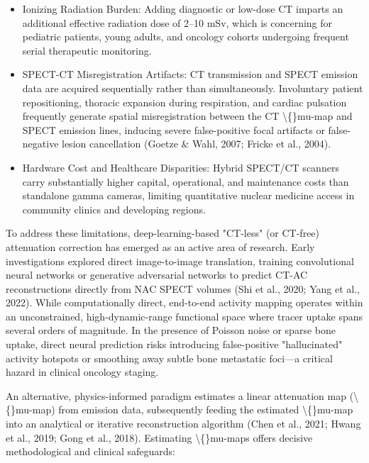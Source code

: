 \documentclass[11pt]{article}
\begin{document}
\begin{itemize}\item  Ionizing Radiation Burden: Adding diagnostic or low-dose CT imparts an additional effective radiation dose of 2–10 mSv, which is concerning for pediatric patients, young adults, and oncology cohorts undergoing frequent serial therapeutic monitoring.\end{itemize}
\begin{itemize}\item  SPECT-CT Misregistration Artifacts: CT transmission and SPECT emission data are acquired sequentially rather than simultaneously. Involuntary patient repositioning, thoracic expansion during respiration, and cardiac pulsation frequently generate spatial misregistration between the CT \textbackslash\{\}mu-map and SPECT emission lines, inducing severe false-positive focal artifacts or false-negative lesion cancellation (Goetze \& Wahl, 2007; Fricke et al., 2004).\end{itemize}
\begin{itemize}\item  Hardware Cost and Healthcare Disparities: Hybrid SPECT/CT scanners carry substantially higher capital, operational, and maintenance costs than standalone gamma cameras, limiting quantitative nuclear medicine access in community clinics and developing regions.\end{itemize}
To address these limitations, deep-learning-based "CT-less" (or CT-free) attenuation correction has emerged as an active area of research. Early investigations explored direct image-to-image translation, training convolutional neural networks or generative adversarial networks to predict CT-AC reconstructions directly from NAC SPECT volumes (Shi et al., 2020; Yang et al., 2022). While computationally direct, end-to-end activity mapping operates within an unconstrained, high-dynamic-range functional space where tracer uptake spans several orders of magnitude. In the presence of Poisson noise or sparse bone uptake, direct neural prediction risks introducing false-positive "hallucinated" activity hotspots or smoothing away subtle bone metastatic foci—a critical hazard in clinical oncology staging.\par

An alternative, physics-informed paradigm estimates a linear attenuation map (\textbackslash\{\}mu-map) from emission data, subsequently feeding the estimated \textbackslash\{\}mu-map into an analytical or iterative reconstruction algorithm (Chen et al., 2021; Hwang et al., 2019; Gong et al., 2018). Estimating \textbackslash\{\}mu-maps offers decisive methodological and clinical safeguards:\par
\end{document}

